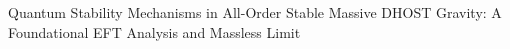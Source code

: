 \documentclass[twocolumn]{aastex631}
\begin{document}
Quantum Stability Mechanisms in All-Order Stable Massive DHOST Gravity: A Foundational EFT Analysis and Massless Limit
\end{document}

